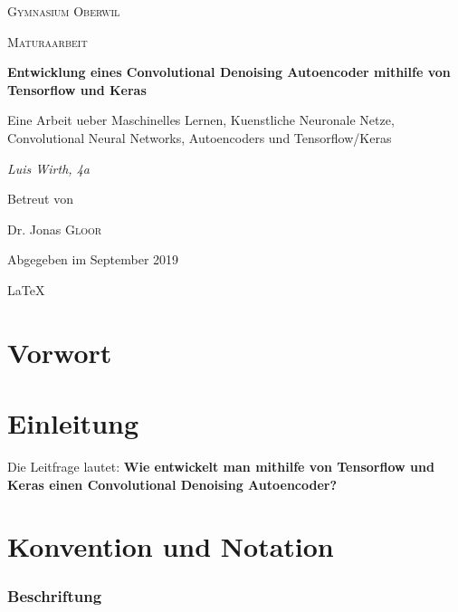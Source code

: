 
\begin{titlepage}
  \centering

  {\scshape\LARGE Gymnasium Oberwil\par}
  \vspace{1cm}
  {\scshape\Large Maturaarbeit\par}
  \vspace{1.5cm}
  {\huge\bfseries Entwicklung eines Convolutional Denoising Autoencoder mithilfe
    von Tensorflow und Keras \par}
  \vspace{1.0cm}
  {\large Eine Arbeit ueber Maschinelles Lernen, Kuenstliche Neuronale Netze, Convolutional Neural
    Networks, Autoencoders und Tensorflow/Keras \par}
  \vspace{2cm}
  {\Large\itshape Luis Wirth, 4a\par}
  \vfill
  Betreut von\par
  Dr. Jonas \textsc{Gloor}

  \vfill
  {\large Abgegeben im September 2019\par}
  \LaTeX{}
\end{titlepage}


\tableofcontents
\pagebreak

\chapter*{Vorwort}
\pagebreak

\chapter*{Einleitung}

Die Leitfrage lautet: \textbf{Wie entwickelt man mithilfe von Tensorflow und
  Keras einen Convolutional Denoising Autoencoder?}
\pagebreak

\chapter*{Konvention und Notation}

\subsection*{Beschriftung}

